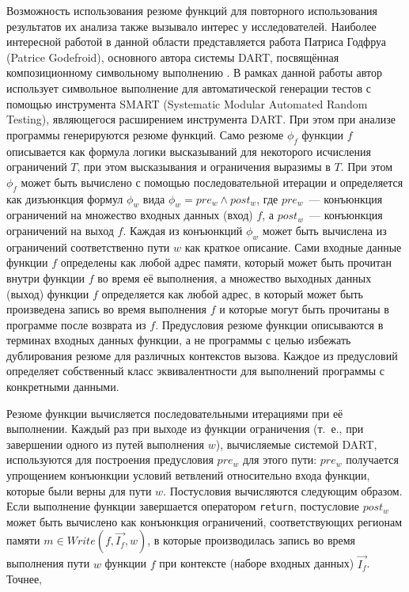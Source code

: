 Возможность использования резюме функций для повторного использования результатов их анализа также вызывало интерес у исследователей. Наиболее интересной работой в данной области представляется работа Патриса Годфруа (Patrice Godefroid), основного автора системы DART, посвящённая композиционному символьному выполнению \cite{godefroid-comp}. В рамках данной работы автор использует символьное выполнение для автоматической генерации тестов с помощью инструмента SMART (Systematic Modular Automated Random Testing), являющегося расширением инструмента DART. При этом при анализе программы генерируются резюме функций. Само резюме $\phi_f$ функции $f$  описывается как формула логики высказываний для некоторого исчисления ограничений $T$, при этом высказывания и ограничения выразимы в $T$. При этом  $\phi_f$ может быть вычислено с помощью последовательной итерации и определяется как дизъюнкция формул $\phi_w$ вида $\phi_w = pre_w \wedge post_w$, где $pre_w$~--- конъюнкция ограничений на множество входных данных (вход) $f$, а $post_w$~--- конъюнкция ограничений на выход $f$. Каждая из конъюнкций $\phi_w$ может быть вычислена из ограничений соответственно пути $w$ как краткое описание. Сами входные данные функции $f$ определены как любой адрес памяти, который может быть прочитан внутри функции $f$ во время её выполнения, а множество выходных данных (выход) функции $f$ определяется как любой адрес, в который может быть произведена запись во время выполнения $f$ и которые могут быть прочитаны в программе после возврата из $f$. Предусловия резюме функции описываются в терминах входных данных функции, а не программы с целью избежать дублирования резюме для различных контекстов вызова. Каждое из предусловий определяет собственный класс эквивалентности для выполнений программы с конкретными данными.

Резюме функции вычисляется последовательными итерациями при её выполнении. Каждый раз при выходе из функции ограничения (т.~е., при завершении одного из путей выполнения $w$), вычисляемые системой DART, используются для построения предусловия $pre_w$ для этого пути: $pre_w$ получается упрощением конъюнкции условий ветвлений относительно входа функции, которые были верны для пути $w$. Постусловия вычисляются следующим образом. Если выполнение функции завершается оператором \texttt{return}, постусловие $post_w$ может быть вычислено как конъюнкция  ограничений, соответствующих регионам памяти $m \in Write(f, \overrightarrow{I_f}, w)$, в которые производилась запись во время выполнения пути $w$ функции $f$ при контексте (наборе входных данных) $\overrightarrow{I_f}$. Точнее, 

